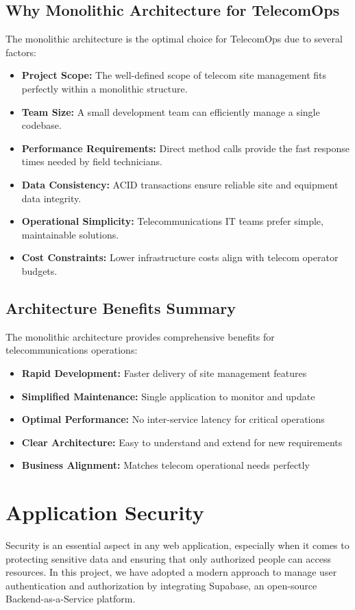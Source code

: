 \subsection{Why Monolithic Architecture for TelecomOps}
The monolithic architecture is the optimal choice for TelecomOps due to several factors:

\begin{itemize}
\item \textbf{Project Scope:} The well-defined scope of telecom site management fits perfectly within a monolithic structure.
\item \textbf{Team Size:} A small development team can efficiently manage a single codebase.
\item \textbf{Performance Requirements:} Direct method calls provide the fast response times needed by field technicians.
\item \textbf{Data Consistency:} ACID transactions ensure reliable site and equipment data integrity.
\item \textbf{Operational Simplicity:} Telecommunications IT teams prefer simple, maintainable solutions.
\item \textbf{Cost Constraints:} Lower infrastructure costs align with telecom operator budgets.
\end{itemize}

\subsection{Architecture Benefits Summary}
The monolithic architecture provides comprehensive benefits for telecommunications operations:

\begin{itemize}
\item \textbf{Rapid Development:} Faster delivery of site management features
\item \textbf{Simplified Maintenance:} Single application to monitor and update
\item \textbf{Optimal Performance:} No inter-service latency for critical operations
\item \textbf{Clear Architecture:} Easy to understand and extend for new requirements
\item \textbf{Business Alignment:} Matches telecom operational needs perfectly
\end{itemize}

\section{Application Security}
Security is an essential aspect in any web application, especially when it comes to protecting sensitive data and ensuring that only authorized people can access resources. In this project, we have adopted a modern approach to manage user authentication and authorization by integrating Supabase, an open-source Backend-as-a-Service platform.

